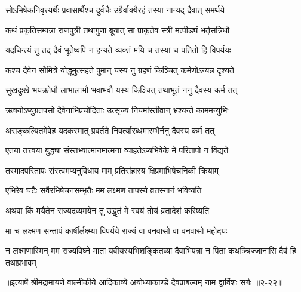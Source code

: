 \twolineshloka
{सोऽभिषेकनिवृत्त्यर्थैः प्रवासार्थैश्च दुर्वचैः}
{उग्रैर्वाक्यैरहं तस्या नान्यद् दैवात् समर्थये} %

\twolineshloka
{कथं प्रकृतिसम्पन्ना राजपुत्री तथागुणा}
{ब्रूयात् सा प्राकृतेव स्त्री मत्पीड्यं भर्तृसन्निधौ} %

\twolineshloka
{यदचिन्त्यं तु तद् दैवं भूतेष्वपि न हन्यते}
{व्यक्तं मयि च तस्यां च पतितो हि विपर्ययः} %

\twolineshloka
{कश्च दैवेन सौमित्रे योद्धुमुत्सहते पुमान्}
{यस्य नु ग्रहणं किञ्चित् कर्मणोऽन्यन्न दृश्यते} %

\twolineshloka
{सुखदुःखे भयक्रोधौ लाभालाभौ भवाभवौ}
{यस्य किञ्चित् तथाभूतं ननु दैवस्य कर्म तत्} %

\twolineshloka
{ऋषयोऽप्युग्रतपसो दैवेनाभिप्रचोदिताः}
{उत्सृज्य नियमांस्तीव्रान् भ्रश्यन्ते काममन्युभिः} %

\twolineshloka
{असङ्कल्पितमेवेह यदकस्मात् प्रवर्तते}
{निवर्त्यारब्धमारम्भैर्ननु दैवस्य कर्म तत्} %

\twolineshloka
{एतया तत्त्वया बुद्ध्या संस्तभ्यात्मानमात्मना}
{व्याहतेऽप्यभिषेके मे परितापो न विद्यते} %

\twolineshloka
{तस्मादपरितापः संस्त्वमप्यनुविधाय माम्}
{प्रतिसंहारय क्षिप्रमाभिषेचनिकीं क्रियाम्} %

\twolineshloka
{एभिरेव घटैः सर्वैरभिषेचनसम्भृतैः}
{मम लक्ष्मण तापस्ये व्रतस्नानं भविष्यति} %

\twolineshloka
{अथवा किं मयैतेन राज्यद्रव्यमयेन तु}
{उद्धृतं मे स्वयं तोयं व्रतादेशं करिष्यति} %

\twolineshloka
{मा च लक्ष्मण सन्तापं कार्षीर्लक्ष्म्या विपर्यये}
{राज्यं वा वनवासो वा वनवासो महोदयः} %

\twolineshloka
{न लक्ष्मणास्मिन् मम राज्यविघ्ने माता यवीयस्यभिशङ्कितव्या}
{दैवाभिपन्ना न पिता कथञ्चिज्जानासि दैवं हि तथाप्रभावम्} %


॥इत्यार्षे श्रीमद्रामायणे वाल्मीकीये आदिकाव्ये अयोध्याकाण्डे दैवप्राबल्यम् नाम द्वाविंशः सर्गः ॥२-२२॥
